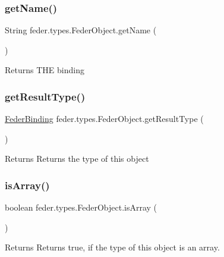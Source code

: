 \subsubsection{\texorpdfstring{get\+Name()}{getName()}}
{\footnotesize\ttfamily String feder.\+types.\+Feder\+Object.\+get\+Name (\begin{DoxyParamCaption}{ }\end{DoxyParamCaption})}

\begin{DoxyReturn}{Returns}
T\+HE binding 
\end{DoxyReturn}
\mbox{\label{classfeder_1_1types_1_1FederObject_a6eb6a31ce2468538288aac6aa0cca06a}} 
\subsubsection{\texorpdfstring{get\+Result\+Type()}{getResultType()}}
{\footnotesize\ttfamily \hyperlink{classfeder_1_1types_1_1FederBinding}{Feder\+Binding} feder.\+types.\+Feder\+Object.\+get\+Result\+Type (\begin{DoxyParamCaption}{ }\end{DoxyParamCaption})}

\begin{DoxyReturn}{Returns}
Returns the type of this object 
\end{DoxyReturn}
\mbox{\label{classfeder_1_1types_1_1FederObject_ab7dfff2509df360900b2680fa1ef06fb}} 
\subsubsection{\texorpdfstring{is\+Array()}{isArray()}}
{\footnotesize\ttfamily boolean feder.\+types.\+Feder\+Object.\+is\+Array (\begin{DoxyParamCaption}{ }\end{DoxyParamCaption})}

\begin{DoxyReturn}{Returns}
Returns true, if the type of this object is an array. 
\end{DoxyReturn}
\mbox{\label{classfeder_1_1types_1_1FederObject_af28926b03ecb38e8d622db9d8857430c}} 
